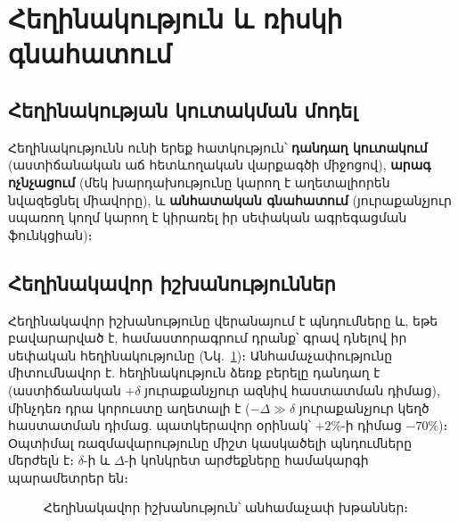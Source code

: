 \documentclass[11pt,a4paper,twocolumn]{article}
\begin{document}
\section{Հեղինակություն և ռիսկի գնահատում}

\subsection{Հեղինակության կուտակման մոդել}

Հեղինակությունն ունի երեք հատկություն՝ \textbf{դանդաղ կուտակում} (աստիճանական աճ հետևողական վարքագծի միջոցով), \textbf{արագ ոչնչացում} (մեկ խարդախությունը կարող է աղետալիորեն նվազեցնել միավորը), և \textbf{անհատական գնահատում} (յուրաքանչյուր սպառող կողմ կարող է կիրառել իր սեփական ագրեգացման ֆունկցիան)։

\subsection{Հեղինակավոր իշխանություններ}

Հեղինակավոր իշխանությունը վերանայում է պնդումները և, եթե բավարարված է, համաստորագրում դրանք՝ գրավ դնելով իր սեփական հեղինակությունը (Նկ.~\ref{fig:authority})։ Անհամաչափությունը միտումնավոր է. հեղինակություն ձեռք բերելը դանդաղ է (աստիճանական $+\delta$ յուրաքանչյուր ազնիվ հաստատման դիմաց), մինչդեռ դրա կորուստը աղետալի է ($-\Delta \gg \delta$ յուրաքանչյուր կեղծ հաստատման դիմաց. պատկերավոր օրինակ՝ $+2\%$-ի դիմաց $-70\%$)։ Օպտիմալ ռազմավարությունը միշտ կասկածելի պնդումները մերժելն է։ $\delta$-ի և $\Delta$-ի կոնկրետ արժեքները համակարգի պարամետրեր են։

\begin{figure}[ht]
\centering
{}
\caption{Հեղինակավոր իշխանություն՝ անհամաչափ խթաններ։}
\label{fig:authority}
\end{figure}
\end{document}
